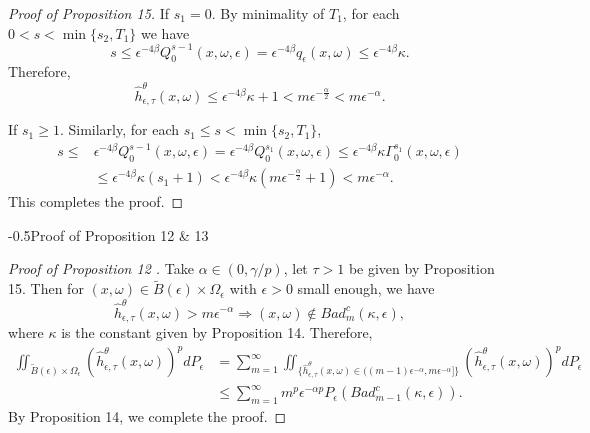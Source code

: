 \documentclass[11pt,oneside]{article}
\makeatletter
\theoremstyle{plain}
\numberwithin{equation}{section}
\numberwithin{figure}{section}
\numberwithin{table}{section}
\renewcommand{\subsection}{\@startsection{subsection}{1}{0mm}
{-\baselineskip}{0.5\baselineskip}{\large\bf\leftline}}
\makeatother
\begin{document}
\begin{proof}[Proof of Proposition 15]
If $s_1 = 0$. By minimality of $T_1$, for each $0 < s < \min\{s_2, T_1 \}$ we have
\[
s \leq \epsilon^{-4 \beta} Q_0^{s-1} (x, \omega, \epsilon) =  \epsilon^{-4 \beta} q_{\epsilon} (x, \omega) \leq  \epsilon^{-4 \beta} \kappa.
\]
Therefore, 
\[
\hat h_{\epsilon, \tau}^{\theta} (x, \omega) \leq  \epsilon^{-4 \beta} \kappa + 1 < m \epsilon^{-\frac{\alpha}{2}} < m \epsilon^{-\alpha}.
\]


If $s_1 \geq 1$. Similarly, for each $s_1 \leq s < \min\{s_2, T_1 \}$, 
\begin{align*}
s \leq & \epsilon^{-4 \beta} Q_0^{s-1} (x, \omega, \epsilon) =\epsilon^{-4 \beta} Q_0^{s_1} (x, \omega, \epsilon) \leq \epsilon^{-4 \beta} \kappa \Gamma_0^{s_1} (x, \omega, \epsilon) \\
& \leq \epsilon^{-4 \beta} \kappa (s_1 + 1) < \epsilon^{-4 \beta} \kappa (m \epsilon^{- \frac{\alpha}{2}} + 1) < m \epsilon^{-\alpha}.
\end{align*}
This completes the proof.


\end{proof}



\subsection{Proof of Proposition 12 \& 13}


\begin{proof}[Proof of Proposition 12 ]

Take $\alpha \in (0, \gamma/p)$, let $\tau > 1$ be given by Proposition 15. Then for $(x, \omega) \in \tilde B(\epsilon) \times \Omega_{\epsilon}$ with $\epsilon > 0$ small enough, we have
\[
\hat h_{\epsilon, \tau}^{\theta} (x, \omega) > m \epsilon^{-\alpha} \Rightarrow (x, \omega) \notin Bad_m^c(\kappa, \epsilon),
\]
where $\kappa$ is the constant given by Proposition 14. Therefore,
\begin{align*}
\iint_{\tilde B(\epsilon) \times \Omega_{\epsilon}} (\hat h^{\theta}_{\epsilon, \tau} (x, \omega) )^p dP_{\epsilon} &= \sum_{m=1}^{\infty} \iint_{\{\hat h^{\theta}_{\epsilon, \tau} (x, \omega) \in ( (m-1) \epsilon^{- \alpha}, m \epsilon^{- \alpha} ]  \}} (\hat h^{\theta}_{\epsilon, \tau} (x, \omega) )^p dP_{\epsilon}\\
& \leq \sum_{m=1}^{\infty} m^p \epsilon^{- \alpha p} P_{\epsilon} (Bad^c_{m-1} (\kappa, \epsilon)).
\end{align*}
By Proposition 14, we complete the proof.

\end{proof}
\end{document}
